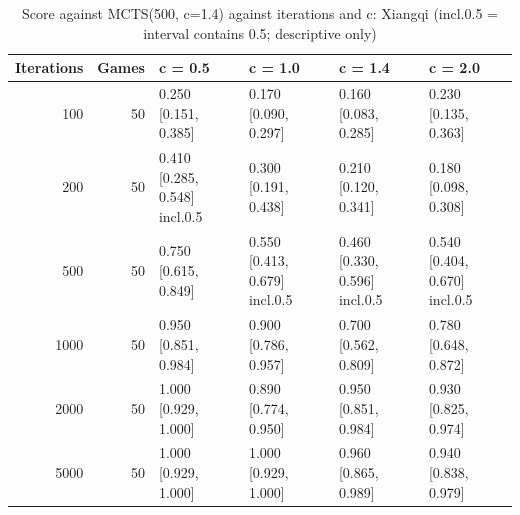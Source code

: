 \begin{table}[!t]
\centering
\caption{Score against MCTS(500, c=1.4) against iterations and c: Xiangqi (incl.0.5 = interval contains 0.5; descriptive only)}
\label{tab:curve_xiangqi}
\small
\begin{tabular}{rrllll}
\toprule
Iterations & Games & c = 0.5 & c = 1.0 & c = 1.4 & c = 2.0 \\
\midrule
100 & 50 & 0.250 [0.151, 0.385] & 0.170 [0.090, 0.297] & 0.160 [0.083, 0.285] & 0.230 [0.135, 0.363] \\
200 & 50 & 0.410 [0.285, 0.548] incl.0.5 & 0.300 [0.191, 0.438] & 0.210 [0.120, 0.341] & 0.180 [0.098, 0.308] \\
500 & 50 & 0.750 [0.615, 0.849] & 0.550 [0.413, 0.679] incl.0.5 & 0.460 [0.330, 0.596] incl.0.5 & 0.540 [0.404, 0.670] incl.0.5 \\
1000 & 50 & 0.950 [0.851, 0.984] & 0.900 [0.786, 0.957] & 0.700 [0.562, 0.809] & 0.780 [0.648, 0.872] \\
2000 & 50 & 1.000 [0.929, 1.000] & 0.890 [0.774, 0.950] & 0.950 [0.851, 0.984] & 0.930 [0.825, 0.974] \\
5000 & 50 & 1.000 [0.929, 1.000] & 1.000 [0.929, 1.000] & 0.960 [0.865, 0.989] & 0.940 [0.838, 0.979] \\
\bottomrule
\end{tabular}
\end{table}
